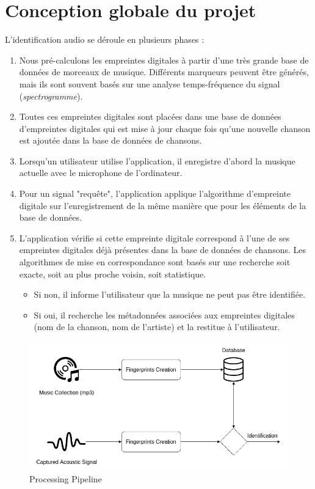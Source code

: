 \documentclass[10pt, report, english]{report}
\begin{document}
\section{Conception globale du projet}

L’identification audio se déroule en plusieurs phases :\\
\begin{enumerate}
	
	\item   Nous pré-calculons les empreintes digitales à partir d'une très grande base de données de morceaux de musique.
	 Différents marqueurs peuvent être générés, mais ils sont souvent basés sur une analyse temps-fréquence du signal (\textit{spectrogramme}).
	\item	Toutes ces empreintes digitales sont placées dans une base de données d'empreintes digitales qui est mise à jour chaque fois qu'une nouvelle chanson est ajoutée dans la base de données de chansons.
	\item   Lorsqu'un utilisateur utilise l'application, il enregistre d'abord la musique actuelle avec le microphone de l’ordinateur.
	\item	Pour un signal "requête", l’application applique l’algorithme d'empreinte digitale sur l'enregistrement de la même manière que pour les éléments de la base de données.
	\item   L'application vérifie si cette empreinte digitale correspond à l'une de ses empreintes digitales déjà présentes dans la base de données de chansons. Les algorithmes de mise en correspondance sont basés sur une recherche soit exacte, soit au plus proche voisin, soit statistique.\begin{itemize}
		\item Si non, il informe l'utilisateur que la musique ne peut pas être identifiée. 
		\item Si oui, il recherche les métadonnées associées aux empreintes digitales (nom de la chanson, nom de l’artiste) et la restitue à l'utilisateur.
	\end{itemize}
\end{enumerate}

\begin{figure}[H]
	\centering
	\includegraphics[scale=0.5]{img/general_schema2.png}
	\caption{Processing Pipeline}
\end{figure}
\end{document}
